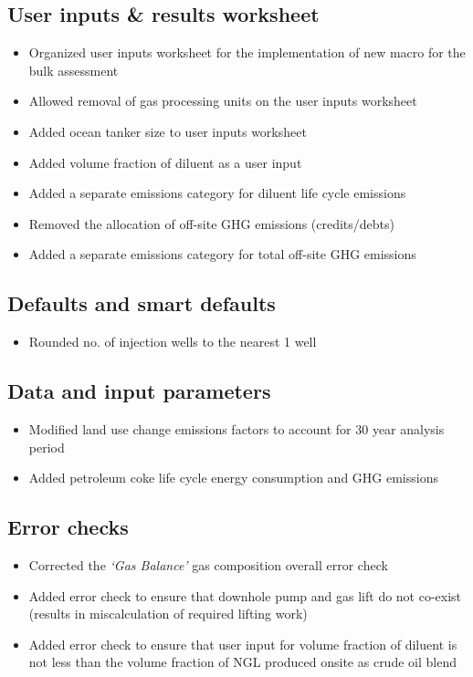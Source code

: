 \documentclass[11pt]{report}
\newcommand{\sheet}[1]{\textit{`{#1}'}}
\begin{document}
\subsection{User inputs \& results worksheet}
\begin{itemize}
\item{Organized user inputs worksheet for the implementation of new macro for the bulk assessment}
\item{Allowed removal of gas processing units on the user inputs worksheet}
\item{Added ocean tanker size to user inputs worksheet}
\item{Added volume fraction of diluent as a user input}
\item{Added a separate emissions category for diluent life cycle emissions}
\item{Removed the allocation of off-site GHG emissions (credits/debts)}
\item{Added a separate emissions category for total off-site GHG emissions}
\end{itemize}

\subsection{Defaults and smart defaults}
\begin{itemize}
\item{Rounded no. of injection wells to the nearest 1 well}
\end{itemize}

\subsection{Data and input parameters}
\begin{itemize}
\item{Modified land use change emissions factors to account for 30 year analysis period}
\item{Added petroleum coke life cycle energy consumption and GHG emissions}
\end{itemize}

\subsection{Error checks}
\begin{itemize}
\item{Corrected the \sheet{Gas Balance} gas composition overall error check}
\item{Added error check to ensure that downhole pump and gas lift do not co-exist (results in miscalculation of required lifting work)}
\item{Added error check to ensure that user input for volume fraction of diluent is not less than the volume fraction of NGL produced onsite as crude oil blend} 
\end{itemize}
\end{document}
